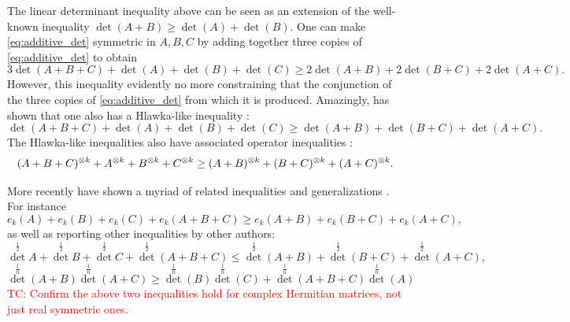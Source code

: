 \documentclass[notitlepage, 10pt]{article}
\begin{document}
The linear determinant inequality above can be seen as an extension of the well-known inequality $\det(A+B) \geq \det(A) + \det(B)$.
One can make \cref{eq:additive_det} symmetric in $A,B,C$ by adding together three copies of \cref{eq:additive_det} to obtain
\begin{equation}
    3\det(A+B+C) + \det(A) + \det(B) + \det(C) \geq 2\det(A+B) + 2\det(B+C) + 2 \det(A+C).
\end{equation}
However, this inequality evidently no more constraining that the conjunction of the three copies of \cref{eq:additive_det} from which it is produced.
Amazingly, \citeauthor{lin2014determinantal} has shown that one also has a Hlawka-like inequality \cite{lin2014determinantal}:
\begin{equation}
    \label{eq:lin_hlawka_ineq}
    \det(A+B+C) + \det(A) + \det(B) + \det(C) \geq \det(A+B) + \det(B+C) + \det(A+C).
\end{equation}
The Hlawka-like inequalities also have associated operator inequalities \cite{berndt2015hlawka}:
\begin{equation}
    (A+B+C)^{\otimes k} + A^{\otimes k} + B^{\otimes k} + C^{\otimes k} \geq (A+B)^{\otimes k} + (B+C)^{\otimes k} + (A+C)^{\otimes k}.
\end{equation}

More recently \citeauthor{niculescu2023functions} have shown a myriad of related inequalities and generalizations \cite{niculescu2023functions}.
For instance
\begin{equation}
    e_k(A) + e_k(B) + e_k(C) + e_k(A+B+C) \geq e_k(A+B) + e_k(B+C) + e_k(A+C),
\end{equation}
as well as reporting other inequalities \cite[Section 6.2]{niculescu2023functions} by other authors:
\begin{equation}
    {\det}^{\frac12} A + {\det}^{\frac12} B + {\det}^{\frac12} C + {\det}^{\frac12}(A+B+C) \leq {\det}^{\frac12}(A+B) + {\det}^{\frac12}(B+C) + {\det}^{\frac12}(A+C),
\end{equation}
\begin{equation}
    {\det}^{\frac1n} (A+B) {\det}^{\frac1n} (A+C) \geq {\det}^{\frac1n} (B) {\det}^{\frac1n} (C) + {\det}^{\frac1n} (A+B+C){\det}^{\frac1n} (A)
\end{equation}
\textcolor{red}{TC: Confirm the above two inequalities hold for complex Hermitian matrices, not just real symmetric ones.}
\end{document}
